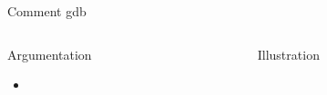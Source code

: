 %
\begin{Frame}{Comment gdb}
  \begin{columns}[t]
    \begin{column}{5cm} %
      \begin{block}{Argumentation}
        \begin{itemize}
        \item 
        \end{itemize}
      \end{block} 
    \end{column}
    
    \begin{column}{5cm} %
      \begin{block}{Illustration}
      \end{block}   
    \end{column}
  \end{columns}  
\end{Frame}


